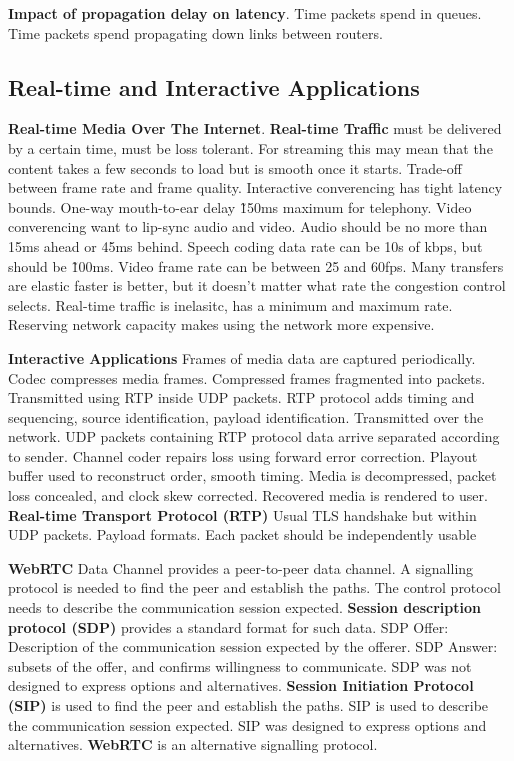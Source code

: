 \documentclass{article}
\begin{document}
\textbf{Impact of propagation delay on latency}.
Time packets spend in queues.
Time packets spend propagating down links between routers.


\subsection*{Real-time and Interactive Applications}

\textbf{Real-time Media Over The Internet}.
\textbf{Real-time Traffic} must be delivered by a certain time, must be loss tolerant.
For streaming this may mean that the content takes a few seconds to load but is smooth once it starts.
Trade-off between frame rate and frame quality.
Interactive converencing has tight latency bounds.
One-way mouth-to-ear delay \~150ms maximum for telephony.
Video converencing want to lip-sync audio and video.
Audio should be no more than 15ms ahead or 45ms behind.
Speech coding data rate can be 10s of kbps, but should be \~100ms.
Video frame rate can be between 25 and 60fps.
Many transfers are elastic \- faster is better, but it doesn't matter what rate the congestion control selects.
Real-time traffic is inelasitc, has a minimum and maximum rate.
Reserving network capacity makes using the network more expensive.

\textbf{Interactive Applications}
Frames of media data are captured periodically.
Codec compresses media frames.
Compressed frames fragmented into packets.
Transmitted using RTP inside UDP packets.
RTP protocol adds timing and sequencing, source identification, payload identification.
Transmitted over the network.
UDP packets containing RTP protocol data arrive separated according to sender.
Channel coder repairs loss using forward error correction.
Playout buffer used to reconstruct order, smooth timing.
Media is decompressed, packet loss concealed, and clock skew corrected.
Recovered media is rendered to user.
\textbf{Real-time Transport Protocol (RTP)}
Usual TLS handshake but within UDP packets.
Payload formats.
Each packet should be independently usable

\textbf{WebRTC} Data Channel provides a peer-to-peer data channel.
A signalling protocol is needed to find the peer and establish the paths.
The control protocol needs to describe the communication session expected.
\textbf{Session description protocol (SDP)} provides a standard format for such data.
SDP Offer: Description of the communication session expected by the offerer.
SDP Answer: subsets of the offer, and confirms willingness to communicate.
SDP was not designed to express options and alternatives.
\textbf{Session Initiation Protocol (SIP)} is used to find the peer and establish the paths.
SIP is used to describe the communication session expected.
SIP was designed to express options and alternatives.
\textbf{WebRTC} is an alternative signalling protocol.
\end{document}
